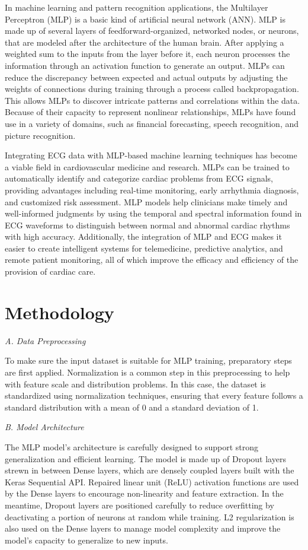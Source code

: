 \documentclass[conference]{IEEEtran}
\begin{document}
In machine learning and pattern recognition applications, the Multilayer Perceptron (MLP) is a basic kind of artificial neural network (ANN). MLP is made up of several layers of feedforward-organized, networked nodes, or neurons, that are modeled after the architecture of the human brain. After applying a weighted sum to the inputs from the layer before it, each neuron processes the information through an activation function to generate an output. MLPs can reduce the discrepancy between expected and actual outputs by adjusting the weights of connections during training through a process called backpropagation. This allows MLPs to discover intricate patterns and correlations within the data. Because of their capacity to represent nonlinear relationships, MLPs have found use in a variety of domains, such as financial forecasting, speech recognition, and picture recognition. 

Integrating ECG data with MLP-based machine learning techniques has become a viable field in cardiovascular medicine and research. MLPs can be trained to automatically identify and categorize cardiac problems from ECG signals, providing advantages including real-time monitoring, early arrhythmia diagnosis, and customized risk assessment. MLP models help clinicians make timely and well-informed judgments by using the temporal and spectral information found in ECG waveforms to distinguish between normal and abnormal cardiac rhythms with high accuracy. Additionally, the integration of MLP and ECG makes it easier to create intelligent systems for telemedicine, predictive analytics, and remote patient monitoring, all of which improve the efficacy and efficiency of the provision of cardiac care. 

\section{Methodology}
\textit{A. Data Preprocessing}

\hspace{1em}To make sure the input dataset is suitable for MLP training, preparatory steps are first applied. Normalization is a common step in this preprocessing to help with feature scale and distribution problems. In this case, the dataset is standardized using normalization techniques, ensuring that every feature follows a standard distribution with a mean of 0 and a standard deviation of 1.

\textit{B. Model Architecture}

\hspace{1em}The MLP model's architecture is carefully designed to support strong generalization and efficient learning. The model is made up of Dropout layers strewn in between Dense layers, which are densely coupled layers built with the Keras Sequential API. Repaired linear unit (ReLU) activation functions are used by the Dense layers to encourage non-linearity and feature extraction. In the meantime, Dropout layers are positioned carefully to reduce overfitting by deactivating a portion of neurons at random while training. L2 regularization is also used on the Dense layers to manage model complexity and improve the model's capacity to generalize to new inputs.
\end{document}
